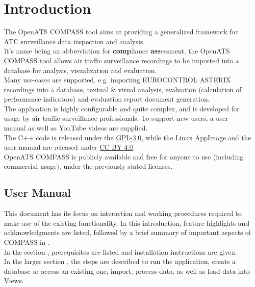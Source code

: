 \chapter{Introduction}

The OpenATS COMPASS tool aims at providing a generalized framework for ATC surveillance data inspection and analysis. \\

It’s name being an abbreviation for \textbf{comp}liance \textbf{ass}essment, the OpenATS COMPASS tool allows air traffic surveillance recordings to be imported into a database for analysis, visualization and evaluation. \\

Many use-cases are supported, e.g. importing EUROCONTROL ASTERIX recordings into a database, textual \& visual analysis, evaluation (calculation of performance indicators) and evaluation report document generation. \\

The application is highly configurable and quite complex, and is developed for usage by air traffic surveillance professionals. To support new users, a user manual as well as YouTube videos are supplied. \\

The C++ code is released under the \href{https://www.gnu.org/licenses/gpl-3.0.en.html}{GPL-3.0}, while the Linux AppImage and the user manual are released under \href{https://creativecommons.org/licenses/by/4.0/}{CC BY 4.0}. \\

OpenATS COMPASS is publicly available and free for anyone to use (including commercial usage), under the previously stated licenses.

\section{User Manual}

This document has its focus on interaction and working procedures required to make use of the existing
functionality. In this introduction, feature highlights and ackknowledgments are listed, followed by a brief summary of important aspects of  COMPASS in . \\

In the section , prerequisites are listed and installation instructions are given. \\

In the larger section , the steps are described to run the application, create a database or access an existing one, import, process data, as well as load data into Views. \\

